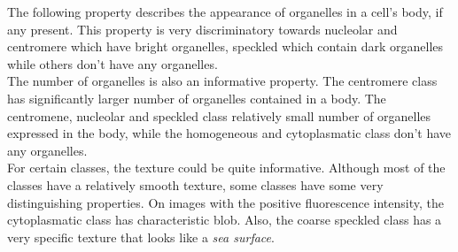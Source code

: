 The following property describes the appearance of organelles in a cell's body, if any present. This property is very discriminatory towards nucleolar and centromere which have bright organelles, speckled which contain dark organelles while others don't have any organelles. \\

The number of organelles is also an informative property. The centromere class has significantly larger number of organelles contained in a body. The centromene, nucleolar and speckled class relatively small number of organelles expressed in the body, while the homogeneous and cytoplasmatic class don't have any organelles. \\

For certain classes, the texture could be quite informative. Although most of the classes have a relatively smooth texture, some classes have some very distinguishing properties. On images with the positive fluorescence intensity, the cytoplasmatic class has characteristic blob. Also, the coarse speckled class has a very specific texture that looks like a \textit{sea surface}. \\



